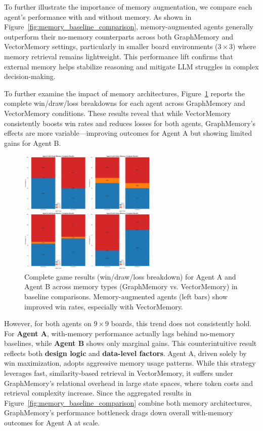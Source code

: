 \documentclass[10pt]{article}
\begin{document}
To further illustrate the importance of memory augmentation, we compare each agent's performance with and without memory. As shown in Figure~\ref{fig:memory_baseline_comparison}, memory-augmented agents generally outperform their no-memory counterparts across both GraphMemory and VectorMemory settings, particularly in smaller board environments ($3\times3$) where memory retrieval remains lightweight. This performance lift confirms that external memory helps stabilize reasoning and mitigate LLM struggles in complex decision-making.

To further examine the impact of memory architectures, Figure~\ref{fig:baseline_complete_results} reports the complete win/draw/loss breakdowns for each agent across GraphMemory and VectorMemory conditions. These results reveal that while VectorMemory consistently boosts win rates and reduces losses for both agents, GraphMemory's effects are more variable—improving outcomes for Agent A but showing limited gains for Agent B.

\begin{figure}[H]
\centering
\includegraphics[width=0.6\textwidth]{figures/memory_baseline/memory_complete_results.png}
\caption{Complete game results (win/draw/loss breakdown) for Agent A and Agent B across memory types (GraphMemory vs. VectorMemory) in baseline comparisons. Memory-augmented agents (left bars) show improved win rates, especially with VectorMemory.}
\label{fig:baseline_complete_results}
\end{figure}

However, for both agents on $9\times9$ boards, this trend does not consistently hold. For \textbf{Agent A}, with-memory performance actually lags behind no-memory baselines, while \textbf{Agent B} shows only marginal gains. This counterintuitive result reflects both \textbf{design logic} and \textbf{data-level factors}. Agent A, driven solely by win maximization, adopts aggressive memory usage patterns. While this strategy leverages fast, similarity-based retrieval in VectorMemory, it suffers under GraphMemory's relational overhead in large state spaces, where token costs and retrieval complexity increase. Since the aggregated results in Figure~\ref{fig:memory_baseline_comparison} combine both memory architectures, GraphMemory's performance bottleneck drags down overall with-memory outcomes for Agent A at scale.
\end{document}
